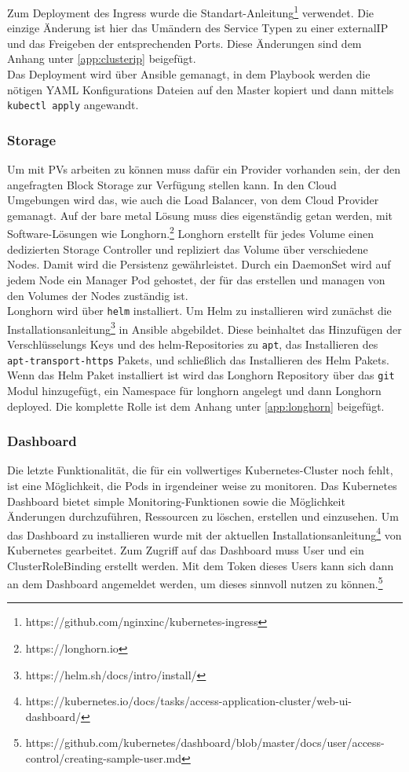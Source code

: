 Zum Deployment des Ingress wurde die Standart-Anleitung\footnote{https://github.com/nginxinc/kubernetes-ingress} verwendet.
Die einzige Änderung ist hier das Umändern des Service Typen zu einer externalIP und das Freigeben der entsprechenden Ports.
Diese Änderungen sind dem Anhang unter \ref{app:clusterip} beigefügt.
\\
Das Deployment wird über Ansible gemanagt, in dem Playbook werden die nötigen \ac{YAML} Konfigurations Dateien auf den Master kopiert und dann mittels \texttt{kubectl apply} angewandt. 


\subsubsection{Storage}
Um mit \ac{PV}s arbeiten zu können muss dafür ein Provider vorhanden sein, der den angefragten Block Storage zur Verfügung stellen kann. 
In den Cloud Umgebungen wird das, wie auch die Load Balancer, von dem Cloud Provider gemanagt. 
Auf der bare metal Lösung muss dies eigenständig getan werden, mit Software-Lösungen wie Longhorn.\footnote{https://longhorn.io}
Longhorn erstellt für jedes Volume einen dedizierten Storage Controller und repliziert das Volume über verschiedene Nodes.
Damit wird die Persistenz gewährleistet.
Durch ein DaemonSet wird auf jedem Node ein Manager Pod gehostet, der für das erstellen und managen von den Volumes der Nodes zuständig ist. 
\\
Longhorn wird über \texttt{helm} installiert. 
Um Helm zu installieren wird zunächst die Installationsanleitung\footnote{https://helm.sh/docs/intro/install/} in Ansible abgebildet.
Diese beinhaltet das Hinzufügen der Verschlüsselungs Keys und des helm-Repositories zu \texttt{apt}, das Installieren des \texttt{apt-transport-https} Pakets, und schließlich das Installieren des Helm Pakets.
\\
Wenn das Helm Paket installiert ist wird das Longhorn Repository über das \texttt{git} Modul hinzugefügt, ein Namespace für longhorn angelegt und dann Longhorn deployed.
Die komplette Rolle ist dem Anhang unter \ref{app:longhorn} beigefügt.

\subsubsection{Dashboard}
Die letzte Funktionalität, die für ein vollwertiges Kubernetes-Cluster noch fehlt, ist eine Möglichkeit, die Pods in irgendeiner weise zu monitoren.
Das Kubernetes Dashboard bietet simple Monitoring-Funktionen sowie die Möglichkeit Änderungen durchzuführen, Ressourcen zu löschen, erstellen und einzusehen.
Um das Dashboard zu installieren wurde mit der aktuellen Installationsanleitung\footnote{https://kubernetes.io/docs/tasks/access-application-cluster/web-ui-dashboard/} von Kubernetes gearbeitet.
Zum Zugriff auf das Dashboard muss User und ein ClusterRoleBinding erstellt werden. 
Mit dem Token dieses Users kann sich dann an dem Dashboard angemeldet werden, um dieses sinnvoll nutzen zu können.\footnote{https://github.com/kubernetes/dashboard/blob/master/docs/user/access-control/creating-sample-user.md}
